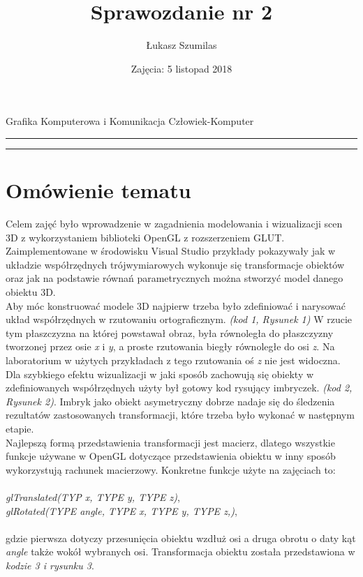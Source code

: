 \documentclass[a4paper,11pt]{article}
\title{Sprawozdanie nr 2}
\author{Łukasz Szumilas}
\date{Zajęcia: 5 listopad 2018}
\begin{document}
  \begin{center}\Large
    Grafika Komputerowa i Komunikacja Człowiek-Komputer
  \end{center}
  \hrule
  {\let\newpage\relax\maketitle}
  \hrule


  \section{Omówienie tematu}
   Celem zajęć było wprowadzenie w zagadnienia modelowania i wizualizacji scen 3D z wykorzystaniem biblioteki OpenGL z rozszerzeniem GLUT. Zaimplementowane w środowisku Visual Studio przykłady pokazywały jak w układzie współrzędnych trójwymiarowych wykonuje się transformacje obiektów oraz jak na podstawie równań parametrycznych można stworzyć  model  danego obiektu 3D. 
\\\indent Aby móc konstruować modele 3D najpierw trzeba było zdefiniować i narysować układ współrzędnych w rzutowaniu ortograficznym. \textit{(kod 1, Rysunek 1)} W rzucie tym płaszczyzna na której powstawał obraz, była równoległa do płaszczyzny tworzonej przez osie \textit{x} i \textit{y}, a proste rzutowania biegły równoległe do osi \textit{z}. Na laboratorium w użytych przykładach z tego rzutowania oś \textit{z} nie jest widoczna.  
\\\indent Dla szybkiego efektu wizualizacji w jaki sposób zachowują się obiekty w zdefiniowanych współrzędnych użyty był gotowy kod rysujący imbryczek. \textit{(kod 2, Rysunek 2)}. Imbryk jako obiekt  asymetryczny dobrze nadaje się do śledzenia rezultatów zastosowanych transformacji, które trzeba było wykonać w następnym etapie. 
\\\indent Najlepszą formą przedstawienia transformacji jest macierz, dlatego wszystkie funkcje używane w OpenGL dotyczące przedstawienia obiektu w inny sposób wykorzystują rachunek macierzowy. Konkretne funkcje użyte na zajęciach to:              \\\\ \textit{glTranslated(TYP x, TYPE y, TYPE z)},
\\\textit{glRotated(TYPE angle, TYPE x, TYPE y, TYPE z,)},
\\\\gdzie pierwsza dotyczy przesunięcia obiektu wzdłuż osi a druga obrotu o daty kąt \textit{angle} także wokół wybranych osi. Transformacja obiektu została przedstawiona w  \textit{kodzie 3 i rysunku 3}.
\end{document}
